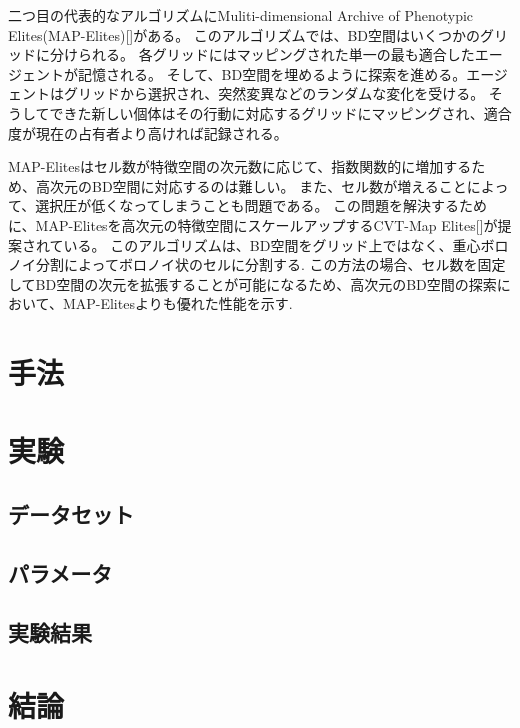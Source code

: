 \documentclass[uplatex,11pt,openany]{ujreport}
\begin{document}
        二つ目の代表的なアルゴリズムにMuliti-dimensional Archive of Phenotypic Elites(MAP-Elites)[]がある。
        このアルゴリズムでは、BD空間はいくつかのグリッドに分けられる。
        各グリッドにはマッピングされた単一の最も適合したエージェントが記憶される。
        そして、BD空間を埋めるように探索を進める。エージェントはグリッドから選択され、突然変異などのランダムな変化を受ける。
        そうしてできた新しい個体はその行動に対応するグリッドにマッピングされ、適合度が現在の占有者より高ければ記録される。

        MAP-Elitesはセル数が特徴空間の次元数に応じて、指数関数的に増加するため、高次元のBD空間に対応するのは難しい。
        また、セル数が増えることによって、選択圧が低くなってしまうことも問題である。
        この問題を解決するために、MAP-Elitesを高次元の特徴空間にスケールアップするCVT-Map Elites[]が提案されている。
        このアルゴリズムは、BD空間をグリッド上ではなく、重心ボロノイ分割によってボロノイ状のセルに分割する.
        この方法の場合、セル数を固定してBD空間の次元を拡張することが可能になるため、高次元のBD空間の探索において、MAP-Elitesよりも優れた性能を示す.






\chapter{手法}

\chapter{実験}
    \section{データセット}
    \section{パラメータ}
    \section{実験結果}


\chapter{結論}


\end{document}
